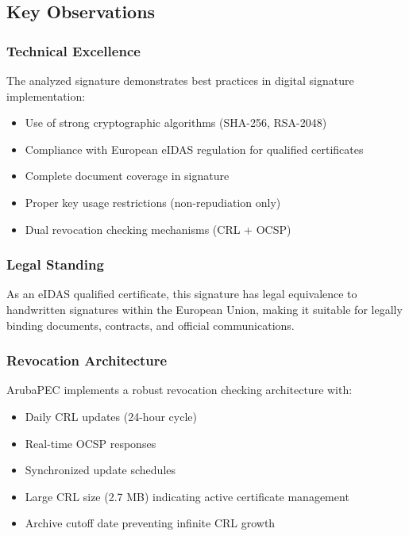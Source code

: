 \documentclass[12pt,a4paper]{article}
\begin{document}
\subsection{Key Observations}

\subsubsection{Technical Excellence}

The analyzed signature demonstrates best practices in digital signature implementation:
\begin{itemize}
    \item Use of strong cryptographic algorithms (SHA-256, RSA-2048)
    \item Compliance with European eIDAS regulation for qualified certificates
    \item Complete document coverage in signature
    \item Proper key usage restrictions (non-repudiation only)
    \item Dual revocation checking mechanisms (CRL + OCSP)
\end{itemize}

\subsubsection{Legal Standing}

As an eIDAS qualified certificate, this signature has legal equivalence to handwritten signatures within the European Union, making it suitable for legally binding documents, contracts, and official communications.

\subsubsection{Revocation Architecture}

ArubaPEC implements a robust revocation checking architecture with:
\begin{itemize}
    \item Daily CRL updates (24-hour cycle)
    \item Real-time OCSP responses
    \item Synchronized update schedules
    \item Large CRL size (2.7 MB) indicating active certificate management
    \item Archive cutoff date preventing infinite CRL growth
\end{itemize}
\end{document}
